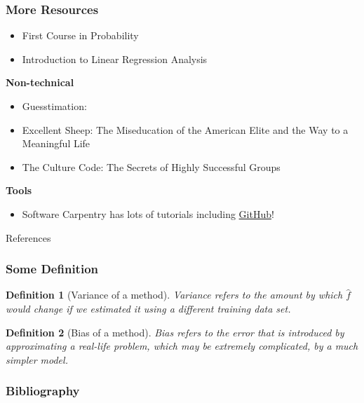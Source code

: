 \documentclass[serif, xcolor={dvipsnames}]{beamer} %
\newtheorem{deff}{Definition}
\begin{document}
\begin{frame}[t]
\frametitle{More Resources}

\begin{itemize}
\item {\scriptsize First Course in Probability~\citep{ross1976first}}
\item {\scriptsize Introduction to Linear Regression Analysis~\citep{montgomery2021introduction}}
\end{itemize}
{\bf \scriptsize  Non-technical}
\begin{itemize}
\item {\scriptsize Guesstimation:~\citep{weinstein2008guesstimation}}
\item {\scriptsize Excellent Sheep: The Miseducation of the American Elite and the Way to a Meaningful Life~\citep{sheep}}
\item {\scriptsize The Culture Code: The Secrets of Highly Successful Groups~\citep{CultureCode}}
\end{itemize}

{\bf \scriptsize  Tools}
\begin{itemize}
\item {\scriptsize Software Carpentry has lots of tutorials including \href{https://swcarpentry.github.io/git-novice/}{GitHub}!}
\end{itemize}
\end{frame}


\begin{frame}[allowframebreaks,t]{References} 
\frametitle{Some Definition}


\begin{deff}[Variance of a method] Variance refers to the amount by which
$\hat f$ would change if we estimated it using a different training data set.
\end{deff}
\pause
\begin{deff}[Bias of a method] Bias refers to the error that is introduced by approximating a real-life problem, which may be extremely complicated, by a much simpler model.
\end{deff}

\end{frame}


\begin{frame}
\frametitle{Bibliography}
\nocite{*}
\printbibliography

\end{frame}
\end{document}
